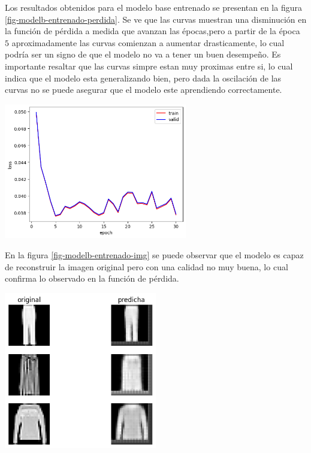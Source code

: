 \documentclass[aps,prl,reprint,groupedaddress]{revtex4-2}
\newenvironment{Figura}
  {\par\medskip\noindent\minipage{\linewidth}}
  {\endminipage\par\medskip}
\begin{document}
Los resultados obtenidos para el modelo base entrenado se presentan en la figura
\ref{fig-modelb-entrenado-perdida}. Se ve que las curvas muestran una 
disminución en la función de pérdida a medida que avanzan las épocas,pero a 
partir de la época $5$ aproximadamente las curvas comienzan a aumentar 
drasticamente, lo cual podría ser un signo de que el modelo no va a tener un 
buen desempeño. Es importante resaltar que las curvas simpre estan muy proximas 
entre si, lo cual indica que el modelo esta generalizando bien, pero dada la 
oscilación de las curvas no se puede asegurar que el modelo este aprendiendo
correctamente.
\begin{Figura}
  \centering
  \includegraphics[width=0.60\textwidth]{figs1/modelo_original.png}
  \label{fig-modelb-entrenado-perdida}
\end{Figura}

En la figura \ref{fig-modelb-entrenado-img} se puede observar que el 
modelo es capaz de reconstruir la imagen original pero con una calidad no muy
buena, lo cual confirma lo observado en la función de pérdida.
\begin{Figura}
  \centering
  \includegraphics[width=0.5\textwidth]{figs1/test_modelo_original.png}
  \label{fig-modelb-entrenado-img}
\end{Figura}
\end{document}
